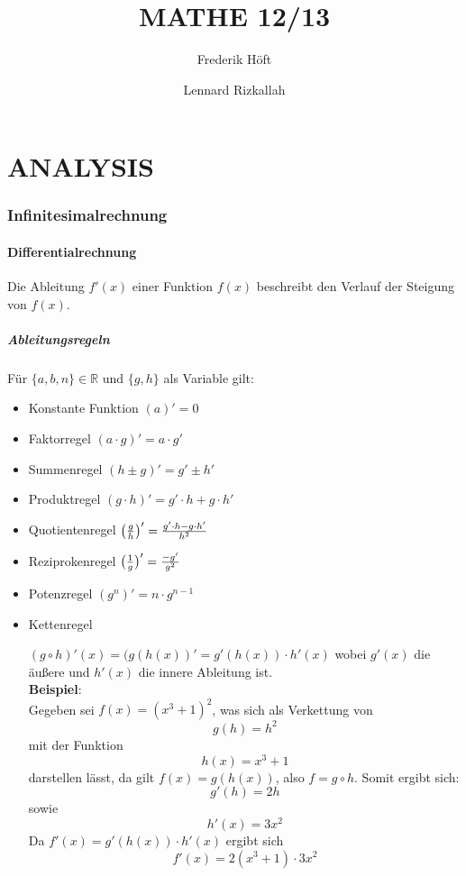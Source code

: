 \documentclass[a4paper,12pt]{article}
\begin{document}
\author{
	Frederik Höft\\
	\and
	Lennard Rizkallah\\
}
\title{MATHE 12/13}
\maketitle
\pagebreak
\tableofcontents{}
\pagebreak
\part{ANALYSIS}
\section{Infinitesimalrechnung}
\subsection{Differentialrechnung}
Die Ableitung $f'(x)$ einer Funktion $f(x)$ beschreibt den Verlauf der Steigung von $f(x)$.
\subsubsection{Ableitungsregeln}
Für $\{a,b,n\} \in \mathbb{R}$ und $\{g,h\}$ als Variable gilt:
\begin{itemize}
\item Konstante Funktion
	\subitem $(a)' = 0$
\item Faktorregel
	\subitem $(a \cdot g)' = a \cdot g'$
\item Summenregel
	\subitem $(h \pm g)' = g' \pm h'$
\item Produktregel
	\subitem $(g \cdot h)' = g' \cdot h + g \cdot h'$
\item Quotientenregel
	\subitem $\big{(}\frac{g}{h}\big{)}' = \frac{g' \cdot h - g \cdot h'}{h^2}$
\item Reziprokenregel
	\subitem $\big{(}\frac{1}{g}\big{)}' = \frac{-g'}{g^2}$
\item Potenzregel
	\subitem $(g^n)' = n \cdot g^{n-1}$
\pagebreak
\item Kettenregel
	\subitem \parbox[t]{\linewidth}{$(g \circ h)'(x) = (g(h(x))' = g'(h(x)) \cdot h'(x)$
		wobei $g'(x)$ die äußere und $h'(x)$ die innere Ableitung ist.\\
		\textbf{Beispiel}:\\
		Gegeben sei $f(x) = (x^3 + 1)^2$, was sich als Verkettung von
		$$g(h) = h^2$$
		mit der Funktion
		$$h(x) = x^3 + 1$$
		darstellen lässt, da gilt $f(x) = g(h(x))$, also $f = g \circ h$. Somit ergibt sich:
		$$g'(h) = 2h$$
		sowie
		$$h'(x) = 3x^2$$
		Da $f'(x) = g'(h(x)) \cdot h'(x)$ ergibt sich
		$$f'(x) = 2(x^3 + 1) \cdot 3x^2$$}
\end{itemize}
\pagebreak
\end{document}
